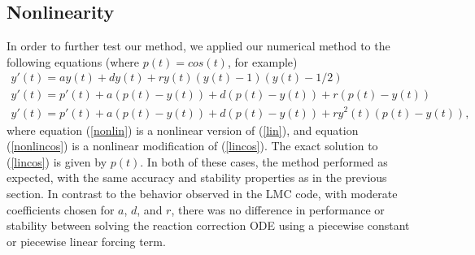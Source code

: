 \documentclass[12pt]{article}
\begin{document}
\subsection{Nonlinearity}
In order to further test our method, we applied our numerical method to 
the following equations (where $p(t) = cos(t)$, for example)
\begin{gather}
    \label{nonlin}
    y'(t) = ay(t) + dy(t) + ry(t)(y(t) - 1)(y(t) - 1/2)\\
    \label{lincos}
    y'(t) = p'(t) + a(p(t)-y(t)) + d(p(t)-y(t)) + r(p(t) - y(t)) \\
    \label{nonlincos}
    y'(t) = p'(t) + a(p(t)-y(t)) + d(p(t)-y(t)) + ry^2(t)(p(t) - y(t)),
\end{gather}
where equation (\ref{nonlin}) is a nonlinear version of (\ref{lin}), and 
equation (\ref{nonlincos}) is a nonlinear modification of (\ref{lincos}). The 
exact solution to (\ref{lincos}) is given by $p(t)$. In both of these cases, 
the method performed as expected, with the same accuracy and stability 
properties as in the previous section. In contrast to the behavior observed 
in the LMC code, with moderate coefficients chosen for $a$, $d$, and $r$, there 
was no difference in performance or stability between solving the reaction 
correction ODE using a piecewise constant or piecewise linear forcing term.
\end{document}
